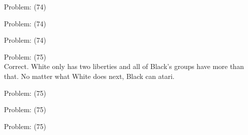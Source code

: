 \documentclass[11pt]{article}
\begin{document}
\begin{minipage}[t]{0.5\textwidth}
  {\centering
  
  Problem: (74)\\
  
  }
\end{minipage}
\begin{minipage}[t]{0.5\textwidth}
  {\centering
  
  Problem: (74)\\
  
  }
\end{minipage}
\begin{minipage}[t]{0.5\textwidth}
  {\centering
  
  Problem: (74)\\
  
  }
\end{minipage}
\begin{minipage}[t]{0.5\textwidth}
  {\centering
  
  Problem: (75)\\
  Correct. White only has two liberties and all of Black's groups have more than that. No matter what White does next, Black can atari.\\
  }
\end{minipage}
\begin{minipage}[t]{0.5\textwidth}
  {\centering
  
  Problem: (75)\\
  
  }
\end{minipage}
\begin{minipage}[t]{0.5\textwidth}
  {\centering
  
  Problem: (75)\\
  
  }
\end{minipage}
\begin{minipage}[t]{0.5\textwidth}
  {\centering
  
  Problem: (75)\\
  
  }
\end{minipage}
\end{document}

